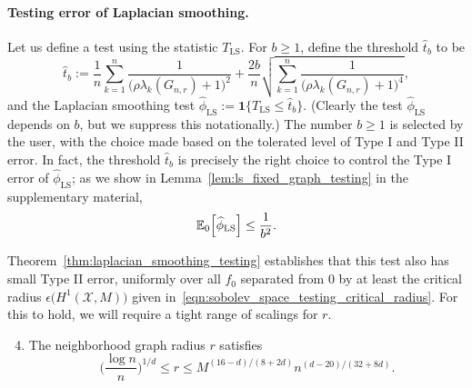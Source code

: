 \documentclass[twoside]{article}
\newcommand{\1}{\mathbf{1}}
\newcommand{\Xset}{\mathcal{X}}
\newcommand{\Ebb}{\mathbb{E}}
\newcommand{\wh}[1]{\widehat{#1}}
\newcommand{\LS}{\mathrm{LS}}
\theoremstyle{definition}
\theoremstyle{remark}
\begin{document}
\paragraph{Testing error of Laplacian smoothing.}
Let us define a test using the statistic $T_{\LS}$. For $b \geq 1$, define the threshold $\wh{t}_b$ to be
\begin{equation*}
\wh{t}_{b} := \frac{1}{n}\sum_{k = 1}^{n} \frac{1}{\bigl(\rho \lambda_k(G_{n,r}) + 1\bigr)^2} + \frac{2b}{n}\sqrt{\sum_{k = 1}^{n} \frac{1}{\bigl(\rho \lambda_k(G_{n,r}) + 1\bigr)^4}},
\end{equation*}
and the Laplacian smoothing test $\wh{\phi}_{\LS} := \1\bigl\{T_{\LS} \leq \wh{t}_b\bigr\}$. (Clearly the test $\wh{\phi}_{\LS}$ depends on $b$, but we suppress this notationally.) The number $b \geq 1$ is selected by the user, with the choice made based on the tolerated level of Type I and Type II error. In fact, the threshold $\wh{t}_b$ is precisely the right choice to control the Type I error of $\wh{\phi}_{\LS}$; as we show in Lemma~\ref{lem:ls_fixed_graph_testing} in the supplementary material,
\begin{equation*}
\Ebb_0\Bigl[\wh{\phi}_{\LS}\Bigr] \leq \frac{1}{b^2}.
\end{equation*}

Theorem~\ref{thm:laplacian_smoothing_testing} establishes that this test also has small Type II error, uniformly over all $f_0$ separated from $0$ by at least the critical radius $\epsilon\bigl(H^1(\Xset,M)\bigr)$ given in~\eqref{eqn:sobolev_space_testing_critical_radius}. For this to hold, we will require a tight range of scalings for $r$.
\begin{enumerate}[label=(R\arabic*)]
	\setcounter{enumi}{3}
	\item 
	\label{asmp:ls_kernel_radius_testing}
	The neighborhood graph radius $r$ satisfies
	\begin{equation*}
	\biggl(\frac{\log n}{n}\biggr)^{1/d} \leq r \leq M^{(16 - d)/(8 + 2d)}n^{(d - 20)/(32 + 8d)}.
	\end{equation*}
\end{enumerate}
\end{document}
